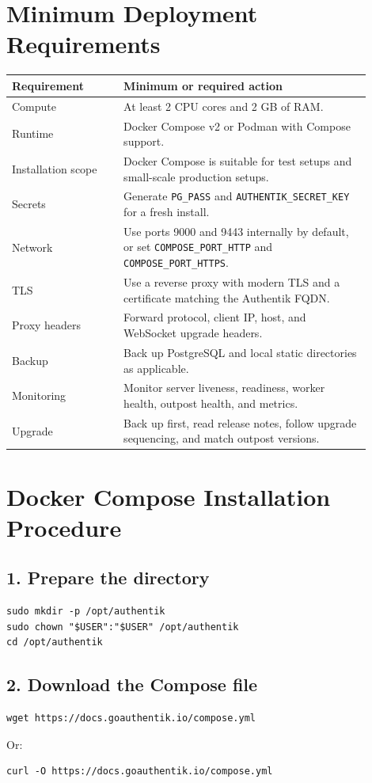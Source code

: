 \documentclass[11pt]{article}
\begin{document}
\section*{Minimum Deployment Requirements}
\begin{longtable}{>{\raggedright\arraybackslash}p{0.28\linewidth}>{\raggedright\arraybackslash}p{0.62\linewidth}}
\textbf{Requirement} & \textbf{Minimum or required action} \\
\hline
Compute & At least 2 CPU cores and 2 GB of RAM. \\
Runtime & Docker Compose v2 or Podman with Compose support. \\
Installation scope & Docker Compose is suitable for test setups and small-scale production setups. \\
Secrets & Generate \texttt{PG\_PASS} and \texttt{AUTHENTIK\_SECRET\_KEY} for a fresh install. \\
Network & Use ports 9000 and 9443 internally by default, or set \texttt{COMPOSE\_PORT\_HTTP} and \texttt{COMPOSE\_PORT\_HTTPS}. \\
TLS & Use a reverse proxy with modern TLS and a certificate matching the Authentik FQDN. \\
Proxy headers & Forward protocol, client IP, host, and WebSocket upgrade headers. \\
Backup & Back up PostgreSQL and local static directories as applicable. \\
Monitoring & Monitor server liveness, readiness, worker health, outpost health, and metrics. \\
Upgrade & Back up first, read release notes, follow upgrade sequencing, and match outpost versions. \\
\end{longtable}

\section*{Docker Compose Installation Procedure}
\subsection*{1. Prepare the directory}
\begin{verbatim}
sudo mkdir -p /opt/authentik
sudo chown "$USER":"$USER" /opt/authentik
cd /opt/authentik
\end{verbatim}

\subsection*{2. Download the Compose file}
\begin{verbatim}
wget https://docs.goauthentik.io/compose.yml
\end{verbatim}
Or:
\begin{verbatim}
curl -O https://docs.goauthentik.io/compose.yml
\end{verbatim}
\end{document}
